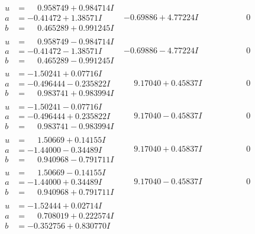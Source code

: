\documentclass[1p]{elsarticle_modified}
\theoremstyle{definition}
\begin{document}
$$\begin{array}{c|c|c}
\begin{aligned}
u &= \phantom{-}0.958749 + 0.984714 I \\
a &= -0.41472 + 1.38571 I \\
b &= \phantom{-}0.465289 + 0.991245 I\end{aligned}
 & -0.69886 + 4.77224 I & \phantom{-0.000000 } 0 \\ \hline\begin{aligned}
u &= \phantom{-}0.958749 - 0.984714 I \\
a &= -0.41472 - 1.38571 I \\
b &= \phantom{-}0.465289 - 0.991245 I\end{aligned}
 & -0.69886 - 4.77224 I & \phantom{-0.000000 } 0 \\ \hline\begin{aligned}
u &= -1.50241 + 0.07716 I \\
a &= -0.496444 - 0.235822 I \\
b &= \phantom{-}0.983741 + 0.983994 I\end{aligned}
 & \phantom{-}9.17040 + 0.45837 I & \phantom{-0.000000 } 0 \\ \hline\begin{aligned}
u &= -1.50241 - 0.07716 I \\
a &= -0.496444 + 0.235822 I \\
b &= \phantom{-}0.983741 - 0.983994 I\end{aligned}
 & \phantom{-}9.17040 - 0.45837 I & \phantom{-0.000000 } 0 \\ \hline\begin{aligned}
u &= \phantom{-}1.50669 + 0.14155 I \\
a &= -1.44000 - 0.34489 I \\
b &= \phantom{-}0.940968 - 0.791711 I\end{aligned}
 & \phantom{-}9.17040 + 0.45837 I & \phantom{-0.000000 } 0 \\ \hline\begin{aligned}
u &= \phantom{-}1.50669 - 0.14155 I \\
a &= -1.44000 + 0.34489 I \\
b &= \phantom{-}0.940968 + 0.791711 I\end{aligned}
 & \phantom{-}9.17040 - 0.45837 I & \phantom{-0.000000 } 0 \\ \hline\begin{aligned}
u &= -1.52444 + 0.02714 I \\
a &= \phantom{-}0.708019 + 0.222574 I \\
b &= -0.352756 + 0.830770 I\end{aligned}

\end{array}$$
\end{document}
